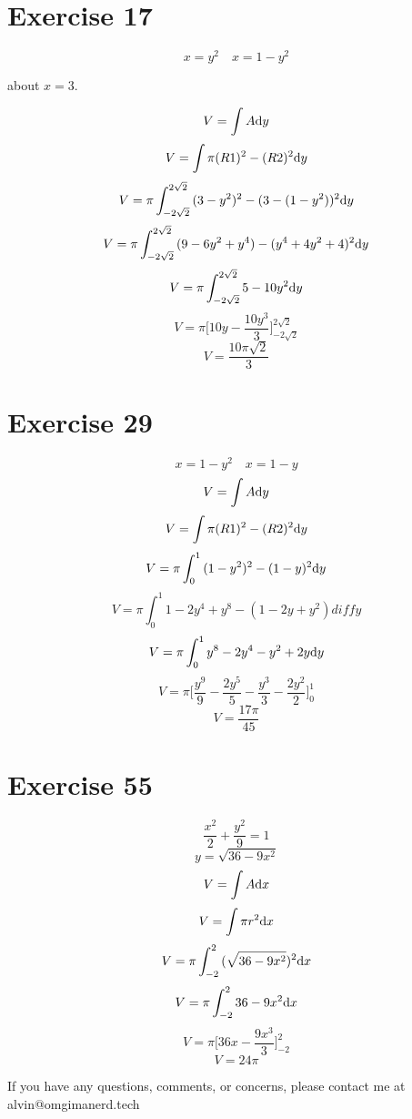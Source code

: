 \documentclass[letterpaper, 12pt]{math}
\begin{document}
\section*{Exercise 17}
\[ x = y^{2} \quad x = 1-y^{2} \]
\begin{center}
  about \( x = 3 \).
\end{center}
\[ V = \int{A\mathrm{d}{y}} \]
\[ V = \int{\pi(R1)^{2}-(R2)^{2}\mathrm{d}{y}} \]
\[ V = \pi\int_{-2\sqrt{2}}^{2\sqrt{2}}
       {(3-y^{2})^{2}-(3-(1-y^{2}))^{2}\mathrm{d}{y}} \]
\[ V = \pi\int_{-2\sqrt{2}}^{2\sqrt{2}}
       {(9-6y^{2}+y^{4})-(y^{4}+4y^{2}+4)^{2}\mathrm{d}{y}} \]
\[ V = \pi\int_{-2\sqrt{2}}^{2\sqrt{2}}{5-10y^{2}\mathrm{d}{y}} \]
\[ V = \pi\bigg[10y-\frac{10y^{3}}{3}\bigg]_{-2\sqrt{2}}^{2\sqrt{2}} \]
\[ V = \frac{10\pi\sqrt{2}}{3} \]

\section*{Exercise 29}
\[ x = 1-y^{2} \quad x=1-y \]
\[ V = \int{A\mathrm{d}{y}} \]
\[ V = \int{\pi(R1)^{2}-(R2)^{2}\mathrm{d}{y}} \]
\[ V = \pi\int_{0}^{1}{(1-y^{2})^{2}-(1-y)^{2}\mathrm{d}{y}} \]
\[ V = \pi\int_{0}^{1}{1-2y^{4}+y^{8}-(1-2y+y^{2})diff{y}} \]
\[ V = \pi\int_{0}^{1}{y^{8}-2y^{4}-y^{2}+2y\mathrm{d}{y}} \]
\[ V = \pi\bigg[\frac{y^{9}}{9}-\frac{2y^{5}}{5}-
       \frac{y^{3}}{3}-\frac{2y^{2}}{2}\bigg]_{0}^{1} \]
\[ V = \frac{17\pi}{45} \]

\section*{Exercise 55}
\[ \frac{x^{2}}{2}+\frac{y^{2}}{9} = 1 \]
\[ y = \sqrt{36-9x^{2}} \]
\[ V = \int{A\mathrm{d}{x}} \]
\[ V = \int{\pi r^{2}\mathrm{d}{x}} \]
\[ V = \pi\int_{-2}^{2}{(\sqrt{36-9x^{2}})^{2}\mathrm{d}{x}} \]
\[ V = \pi\int_{-2}^{2}{36-9x^{2}\mathrm{d}{x}} \]
\[ V = \pi\bigg[36x-\frac{9x^{3}}{3}\bigg]_{-2}^{2} \]
\[ V = 24\pi \]

\begin{center}
  If you have any questions, comments, or concerns, please contact me at
  alvin@omgimanerd.tech
\end{center}
\end{document}
